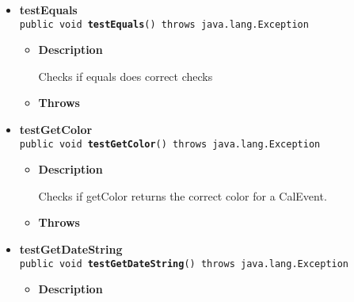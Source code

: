 \documentclass[11pt,a4paper]{report}
\begin{document}
{{{\begin{itemize}
{\begin{itemize}
{Creates a CalEvent with start date same as end date. Expects IllegalArgumentException.
}
\item{{\bf  Throws}
}%
\end{itemize}
}%
\item{ 
{\bf  testEquals}\\
\texttt{public void\ {\bf  testEquals}() throws java.lang.Exception
\label{is.mpg.ruglan.test.CalEventTest.testEquals()}}%
\begin{itemize}
\item{
{\bf  Description}

Checks if equals does correct checks
}
\item{{\bf  Throws}
}%
\end{itemize}
}%
\item{ 
{\bf  testGetColor}\\
\texttt{public void\ {\bf  testGetColor}() throws java.lang.Exception
\label{is.mpg.ruglan.test.CalEventTest.testGetColor()}}%
\begin{itemize}
\item{
{\bf  Description}

Checks if getColor returns the correct color for a CalEvent.
}
\item{{\bf  Throws}
}%
\end{itemize}
}%
\item{ 
{\bf  testGetDateString}\\
\texttt{public void\ {\bf  testGetDateString}() throws java.lang.Exception
\label{is.mpg.ruglan.test.CalEventTest.testGetDateString()}}%
\begin{itemize}
\item{
{\bf  Description}

}
\end{itemize}}
\end{itemize}}}}
\end{document}
